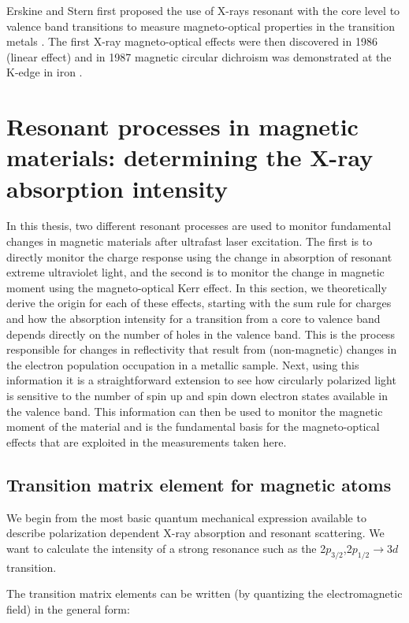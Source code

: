 Erskine and Stern first proposed the use of X-rays resonant with the core level to valence band transitions to measure magneto-optical properties in the transition metals \cite{Erskine1975}. The first X-ray magneto-optical effects were then discovered in 1986 (linear effect) \cite{VanderLaan1986} and in 1987 magnetic circular dichroism was demonstrated at the K-edge in iron \cite{Schuetz1987}.

\section{Resonant processes in magnetic materials: determining the X-ray absorption intensity}

In this thesis, two different resonant processes are used to monitor fundamental changes in magnetic materials after ultrafast laser excitation. The first is to directly monitor the charge response using the change in absorption of resonant extreme ultraviolet light, and the second is to monitor the change in magnetic moment using the magneto-optical Kerr effect. In this section, we theoretically derive the origin for each of these effects, starting with the sum rule for charges and how the absorption intensity for a transition from a core to valence band depends directly on the number of holes in the valence band. This is the process responsible for changes in reflectivity that result from (non-magnetic) changes in the electron population occupation in a metallic sample. Next, using this information it is a straightforward extension to see how circularly polarized light is sensitive to the number of spin up and spin down electron states available in the valence band. This information can then be used to monitor the magnetic moment of the material and is the fundamental basis for the magneto-optical effects that are exploited in the measurements taken here.

\subsection{Transition matrix element for magnetic atoms}

We begin from the most basic quantum mechanical expression available to describe polarization dependent X-ray absorption and resonant scattering. We want to calculate the intensity of a strong resonance such as the 2$p_{3/2}$,2$p_{1/2}\rightarrow3d$ transition.

The transition matrix elements can be written (by quantizing the electromagnetic field) in the general form:

